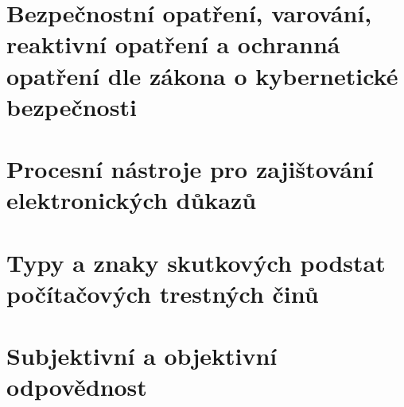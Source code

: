 \clearpage
\section{Bezpečnostní opatření, varování, reaktivní opatření a ochranná opatření dle zákona o kybernetické bezpečnosti}

\clearpage
\section{Procesní nástroje pro zajištování elektronických důkazů}

\clearpage
\section{Typy a znaky skutkových podstat počítačových trestných činů}

\clearpage
\section{Subjektivní a objektivní odpovědnost}
